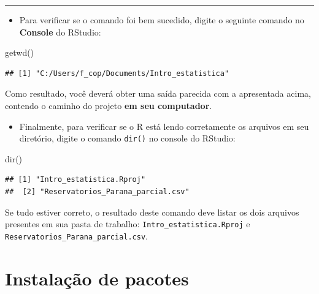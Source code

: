 \documentclass[
]{book}
\newenvironment{Shaded}{\begin{snugshade}}{\end{snugshade}}
\newcommand{\FunctionTok}[1]{\textcolor[rgb]{0.00,0.00,0.00}{#1}}
\newcommand{\NormalTok}[1]{#1}
\providecommand{\tightlist}{%
  \setlength{\itemsep}{0pt}\setlength{\parskip}{0pt}}
\begin{document}
\begin{center}\rule{0.5\linewidth}{0.5pt}\end{center}

\begin{itemize}
\tightlist
\item
  Para verificar se o comando foi bem sucedido, digite o seguinte comando no \textbf{Console} do RStudio:
\end{itemize}

\begin{Shaded}
\begin{Highlighting}[]
\FunctionTok{getwd}\NormalTok{()}
\end{Highlighting}
\end{Shaded}

\begin{verbatim}
## [1] "C:/Users/f_cop/Documents/Intro_estatistica"
\end{verbatim}

Como resultado, você deverá obter uma saída parecida com a apresentada acima, contendo o caminho do projeto \textbf{em seu computador}.

\begin{itemize}
\tightlist
\item
  Finalmente, para verificar se o R está lendo corretamente os arquivos em seu diretório, digite o comando \texttt{dir()} no console do RStudio:
\end{itemize}

\begin{Shaded}
\begin{Highlighting}[]
\FunctionTok{dir}\NormalTok{()}
\end{Highlighting}
\end{Shaded}

\begin{verbatim}
## [1] "Intro_estatistica.Rproj" 
##  [2] "Reservatorios_Parana_parcial.csv"
\end{verbatim}

Se tudo estiver correto, o resultado deste comando deve listar os dois arquivos presentes em sua pasta de trabalho: \texttt{Intro\_estatistica.Rproj} e \texttt{Reservatorios\_Parana\_parcial.csv}.

\hypertarget{instalauxe7uxe3o-de-pacotes}{%
\section{Instalação de pacotes}\label{instalauxe7uxe3o-de-pacotes}}
\end{document}
